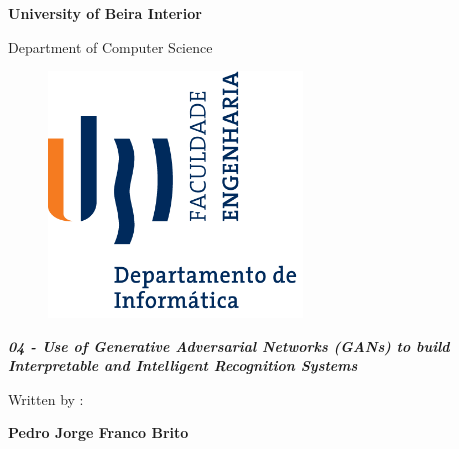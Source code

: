 \documentclass[12pt,a4paper,oneside]{memoir}
\begin{document}

\thispagestyle{empty}
\setcounter{page}{-1}

\begin{center}
\begin{Huge}
\textbf{University of Beira Interior}
\end{Huge}
\end{center}

\begin{center}
\begin{Huge}
Department of Computer Science
\end{Huge}
\end{center}

\vspace{0,07cm}
\begin{figure}[!htb]
\centering
\includegraphics[width=191pt]{ubi-fe-di.png}
\end{figure}

\vspace{0.5cm}
\begin{center}
\begin{Large}
\textbf{\emph{04 - Use of Generative Adversarial Networks
(GANs) to build Interpretable and Intelligent Recognition Systems}}
\end{Large}
\end{center}


\vspace{0.5cm}
\begin{center}
\begin{normalsize}
\begin{large}
Written by :
\end{large}
\end{normalsize}
\end{center}

\vspace{0.2cm}
\begin{center}
\begin{large}
\textbf{Pedro Jorge Franco Brito}
\end{large}
\end{center}
\end{document}
